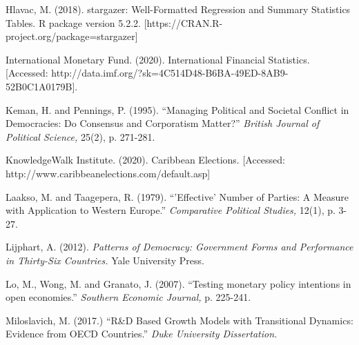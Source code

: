 \documentclass[11pt, oneside]{article}   	%
\begin{document}
\begin{flushleft}

Hlavac, M. (2018). stargazer: Well-Formatted Regression and Summary Statistics Tables. R package version 5.2.2. [https://CRAN.R-project.org/package=stargazer]
\end{flushleft}

\begin{flushleft}

International Monetary Fund. (2020). International Financial Statistics. [Accessed: http://data.imf.org/?sk=4C514D48-B6BA-49ED-8AB9-52B0C1A0179B].
\end{flushleft}

\begin{flushleft}

Keman, H. and Pennings, P. (1995). “Managing Political and Societal Conflict in Democracies: Do Consensus and Corporatism Matter?” \textit{British Journal of Political Science,} 25(2), p. 271-281.
\end{flushleft}

\begin{flushleft}

KnowledgeWalk Institute. (2020). Caribbean Elections. [Accessed: http://www.caribbeanelections.com/default.asp]
\end{flushleft}

\begin{flushleft}

Laakso, M. and Taagepera, R. (1979). “’Effective’ Number of Parties: A Measure with Application to Western Europe.” \textit{Comparative Political Studies,} 12(1), p. 3-27.
\end{flushleft}

\begin{flushleft}

Lijphart, A. (2012). \textit{Patterns of Democracy: Government Forms and Performance in Thirty-Six Countries.} Yale University Press.
\end{flushleft}

\begin{flushleft}

Lo, M., Wong, M. and Granato, J. (2007). “Testing monetary policy intentions in open economies.” \textit{Southern Economic Journal,} p. 225-241.
\end{flushleft}

\begin{flushleft}

Miloslavich, M. (2017.) “R\&D Based Growth Models with Transitional Dynamics: Evidence from OECD Countries.” \textit{Duke University Dissertation.}
\end{flushleft}
\end{document}
